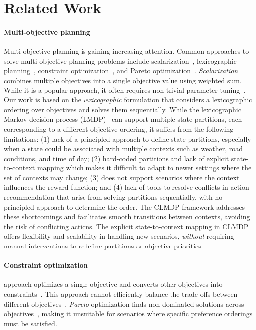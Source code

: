 \section{Related Work}
\paragraph{Multi-objective planning} Multi-objective planning is gaining increasing attention. Common approaches to solve multi-objective planning problems include scalarization~\cite{wilde2024scalarizing,agarwal2022multi,van2013scalarized}, lexicographic planning~\cite{wray2015multi,saisubramanian2021multi,mouaddib2004multi,skalse2022lexicographic}, constraint optimization~\cite{deb2016multi,deb2001nonlinear}, and Pareto optimization~\cite{aydeniz2024entropy,nickelson2024redefining}. \emph{Scalarization} combines multiple objectives into a single objective value using weighted sum. While it is a popular approach, it often requires non-trivial parameter tuning~\cite{roijers2013survey}. Our work is based on the \emph{lexicographic} formulation that considers a lexicographic ordering over objectives and solves them sequentially.
While the lexicographic Markov decision process (LMDP)~\cite{wray2015multi} can support multiple state partitions, each corresponding to a different objective ordering, it suffers from the following limitations: (1) lack of a principled approach to define state partitions, especially when a state could be associated with multiple contexts such as weather, road conditions, and time of day; (2) hard-coded partitions and lack of explicit state-to-context mapping which makes it difficult to adapt to newer settings where the set of contexts may change; (3) does not support scenarios where the context influences the reward function; and (4) lack of tools to resolve conflicts in action recommendation that arise from solving partitions sequentially, with no principled approach to determine the order. 
The CLMDP framework addresses these shortcomings and facilitates smooth transitions between contexts, avoiding the risk of conflicting actions. The explicit state-to-context mapping in CLMDP offers flexibility and scalability in handling new scenarios, \emph{without} requiring manual interventions to redefine partitions or objective priorities. 

\paragraph{Constraint optimization} approach optimizes a single objective and converts other objectives into constraints~\cite{deb2016multi,deb2001nonlinear}. This approach cannot efficiently balance the trade-offs between different objectives~\cite{deb2010efficient}.
\emph{Pareto} optimization finds non-dominated solutions across objectives~\cite{aydeniz2024entropy,nickelson2024redefining}, making it unsuitable for scenarios where specific preference orderings must be satisfied.


